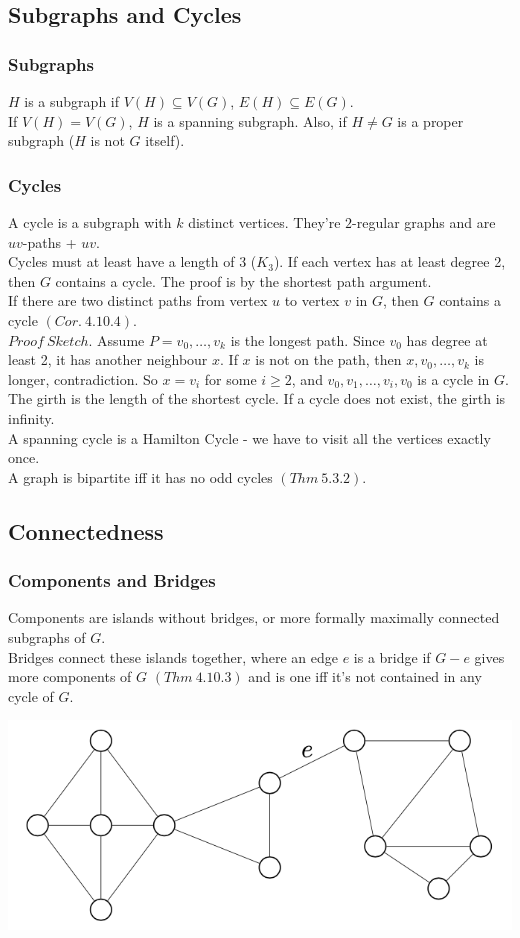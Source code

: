 \documentclass[11pt]{article}
\newcommand{\nl}{\\[5pt]}
\begin{document}
\subsection{Subgraphs and Cycles}

\subsubsection{Subgraphs}
$H$ is a subgraph if $V(H) \subseteq V(G)$, $E(H) \subseteq E(G)$. \nl 
If $V(H) = V(G)$, $H$ is a spanning subgraph. Also, if $H \neq G$ is a proper subgraph ($H$ is not $G$ itself). 

\subsubsection{Cycles}
A cycle is a subgraph with $k$ distinct vertices. They're $2$-regular graphs and are $uv$-paths + $uv$. \nl 
Cycles must at least have a length of 3 ($K_3$). 
If each vertex has at least degree 2, then $G$ contains a cycle. The proof is by the shortest path argument.\nl 
If there are two distinct paths from vertex $u$ to vertex $v$ in $G$, then $G$ contains a cycle $(Cor. \: 4.10.4)$. \nl
$Proof \: Sketch.$ Assume $P = v_0, \dots, v_k$ is the longest path. Since $v_0$ has degree at least 2, it has another neighbour $x$. If $x$ is not on the path, then $x, v_0, \dots, v_k$ is longer, contradiction. So $x = v_i$ for some $i \geq 2$, and $v_0, v_1, \dots, v_i, v_0$ is a cycle in $G$. \hfill \qedsymbol \nl

The girth is the length of the shortest cycle. If a cycle does not exist, the girth is infinity. \nl 
A spanning cycle is a Hamilton Cycle - we have to visit all the vertices exactly once.\nl
A graph is bipartite iff it has no odd cycles $(Thm \: 5.3.2)$.

\subsection{Connectedness}

\subsubsection{Components and Bridges}
Components are islands without bridges, or more formally maximally connected subgraphs of $G$. \nl
Bridges connect these islands together, where an edge $e$ is a bridge if $G-e$ gives more components of $G$ $(Thm \: 4.10.3)$ and is one iff it's not contained in any cycle of $G$. \nl
\begin{center}
    \includegraphics[scale=0.5]{Figures/Bridge.png}
\end{center}
\end{document}
